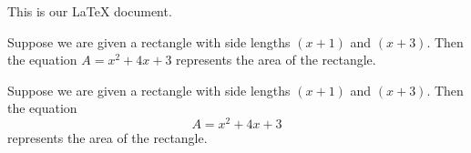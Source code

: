 \documentclass[11pt]{article}
\begin{document}
This is our LaTeX document.

Suppose we are given a rectangle with side lengths $(x+1)$ and $(x+3)$. Then the equation $A=x^2+4x+3$ represents the area of the rectangle.\

Suppose we are given a rectangle with side lengths $(x+1)$ and $(x+3)$. Then the equation \[A=x^2+4x+3\] represents the area of the rectangle.
\end{document}
